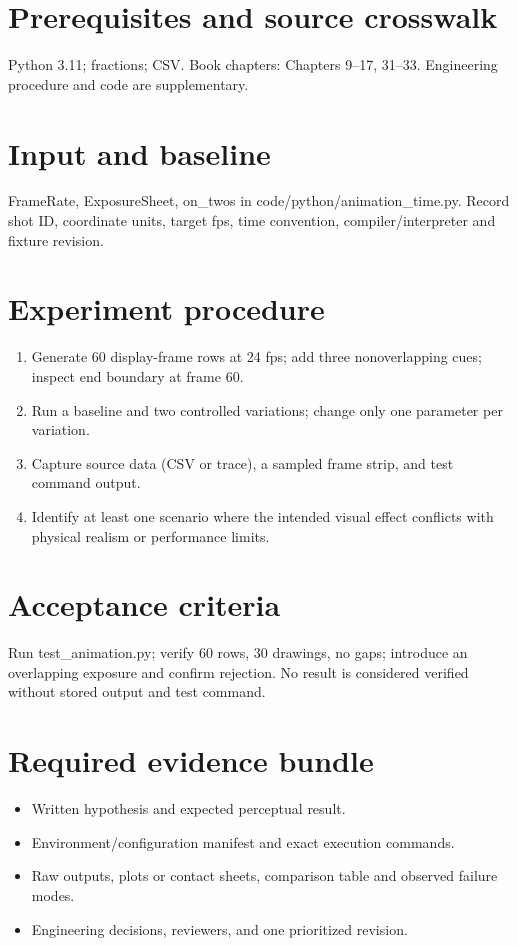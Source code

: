 \documentclass[10pt,letterpaper]{article}
\begin{document}
\makedoctitle
\makedocsummary

\section{Prerequisites and source crosswalk}
Python 3.11; fractions; CSV. Book chapters: Chapters 9--17, 31--33. Engineering procedure and code are supplementary.
\section{Input and baseline}
FrameRate, ExposureSheet, on\_twos in code/python/animation\_time.py. Record shot ID, coordinate units, target fps, time convention, compiler/interpreter and fixture revision.
\section{Experiment procedure}
\begin{enumerate}
\item Generate 60 display-frame rows at 24 fps; add three nonoverlapping cues; inspect end boundary at frame 60.
\item Run a baseline and two controlled variations; change only one parameter per variation.
\item Capture source data (CSV or trace), a sampled frame strip, and test command output.
\item Identify at least one scenario where the intended visual effect conflicts with physical realism or performance limits.
\end{enumerate}
\section{Acceptance criteria}
Run test\_animation.py; verify 60 rows, 30 drawings, no gaps; introduce an overlapping exposure and confirm rejection. No result is considered verified without stored output and test command.
\section{Required evidence bundle}
\begin{itemize}
\item Written hypothesis and expected perceptual result.
\item Environment/configuration manifest and exact execution commands.
\item Raw outputs, plots or contact sheets, comparison table and observed failure modes.
\item Engineering decisions, reviewers, and one prioritized revision.
\end{itemize}
\end{document}
